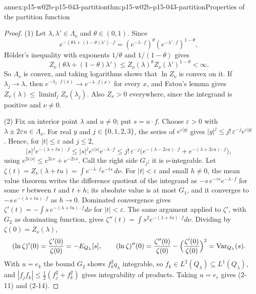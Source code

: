 \begin{annexitem}{annex:p15-w02b-p15-043-partition}{thm:p15-w02b-p15-043-partition}{Properties of the partition function}
\begin{proof}
(1) Let \(\lambda,\lambda'\in\Lambda_\nu\) and \(\theta\in(0,1)\). Since
\[
 e^{-(\theta\lambda+(1-\theta)\lambda')\cdot f}
 =(e^{-\lambda\cdot f})^\theta(e^{-\lambda'\cdot f})^{1-\theta},
\]
H\"older's inequality with exponents \(1/\theta\) and \(1/(1-\theta)\) gives
\[
 Z_\nu(\theta\lambda+(1-\theta)\lambda')\leq Z_\nu(\lambda)^\theta Z_\nu(\lambda')^{1-\theta}<\infty .
\]
So \(\Lambda_\nu\) is convex, and taking logarithms shows that \(\ln Z_\nu\) is
convex on it. If \(\lambda_j\to\lambda\), then
\(e^{-\lambda_j\cdot f(x)}\to e^{-\lambda\cdot f(x)}\) for every \(x\), and
Fatou's lemma gives \(Z_\nu(\lambda)\leq\liminf_jZ_\nu(\lambda_j)\). Also
\(Z_\nu>0\) everywhere, since the integrand is positive and \(\nu\neq0\).

(2) Fix an interior point \(\lambda\) and \(u\neq0\); put \(s=u\cdot f\).
Choose \(\varepsilon>0\) with \(\lambda\pm2\varepsilon u\in\Lambda_\nu\).
For real \(y\) and \(j\in\{0,1,2,3\}\), the series of \(e^{\varepsilon|y|}\)
gives \(|y|^j\leq j!\,\varepsilon^{-j}e^{\varepsilon|y|}\). Hence, for
\(|t|\leq\varepsilon\) and \(j\leq2\),
\[
 |s|^je^{-(\lambda+tu)\cdot f}\leq|s|^je^{\varepsilon|s|}e^{-\lambda\cdot f}
 \leq j!\,\varepsilon^{-j}\bigl(e^{-(\lambda-2\varepsilon u)\cdot f}
            +e^{-(\lambda+2\varepsilon u)\cdot f}\bigr),
\]
using \(e^{2\varepsilon|s|}\leq e^{2\varepsilon s}+e^{-2\varepsilon s}\).
Call the right side \(G_j\); it is \(\nu\)-integrable. Let
\(\zeta(t)=Z_\nu(\lambda+tu)=\int e^{-\lambda\cdot f}e^{-ts}\,d\nu\). For
\(|t|<\varepsilon\) and small \(h\neq0\), the mean value theorem writes the
difference quotient of the integrand as \(-s\,e^{-\tau s}e^{-\lambda\cdot f}\) for
some \(\tau\) between \(t\) and \(t+h\); its absolute value is at most \(G_1\),
and it converges to \(-s\,e^{-(\lambda+tu)\cdot f}\) as \(h\to0\). Dominated
convergence gives \(\zeta'(t)=-\int s\,e^{-(\lambda+tu)\cdot f}d\nu\) for
\(|t|<\varepsilon\). The same argument applied to \(\zeta'\), with \(G_2\) as
dominating function, gives \(\zeta''(t)=\int s^2e^{-(\lambda+tu)\cdot f}d\nu\).
Dividing by \(\zeta(0)=Z_\nu(\lambda)\),
\[
 (\ln\zeta)'(0)=\frac{\zeta'(0)}{\zeta(0)}=-E_{Q_\lambda}[s],\qquad
 (\ln\zeta)''(0)=\frac{\zeta''(0)}{\zeta(0)}-\Bigl(\frac{\zeta'(0)}{\zeta(0)}\Bigr)^2
   =\operatorname{Var}_{Q_\lambda}(s).
\]
With \(u=e_k\) the bound \(G_2\) shows \(f_k^2q_\lambda\) integrable, so
\(f_k\in L^2(Q_\lambda)\subseteq L^1(Q_\lambda)\), and
\(|f_jf_k|\leq\tfrac12(f_j^2+f_k^2)\) gives integrability of products. Taking
\(u=e_r\) gives (2-11) and (2-14).


\end{proof}
\end{annexitem}
